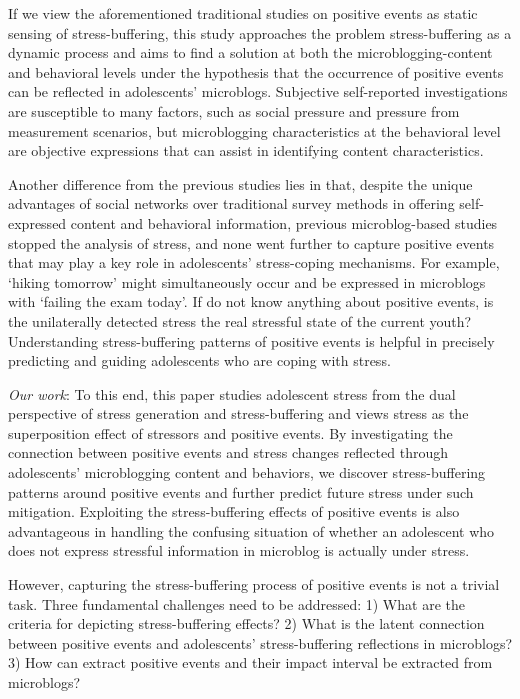 \documentclass[5p,times,numbers,authoryear]{elsarticle}
\begin{document}
If we view the aforementioned traditional studies on positive events as static sensing of stress-buffering, this study approaches the problem stress-buffering as a dynamic process
and aims to find a solution at both the microblogging-content and behavioral levels under the hypothesis that the occurrence of positive events can be reflected in adolescents' microblogs.
Subjective self-reported investigations are susceptible to many factors,
such as
{social pressure}
and pressure from measurement scenarios, but
microblogging characteristics at the behavioral level are objective expressions that can assist in identifying content characteristics.

Another difference from the previous studies lies in that, despite the unique advantages of social networks over traditional survey methods in offering self-expressed content and behavioral information, previous microblog-based studies stopped the analysis of stress,
and none went further to capture positive events that may play a key role in adolescents' stress-coping mechanisms.
For example, `hiking tomorrow' might simultaneously occur and be expressed in microblogs with
{`failing the exam today'.}
If do not know anything about positive events, is the unilaterally detected stress the real stressful state of the current youth?
Understanding stress-buffering patterns of positive events is helpful in precisely predicting and guiding adolescents who are coping with stress.

\emph{Our work}:
To this end, this paper studies adolescent stress from the dual perspective of stress generation and stress-buffering and views stress as the superposition effect of stressors and positive events.
By investigating the connection between positive events and stress changes
reflected through adolescents' microblogging content and behaviors, we discover stress-buffering patterns around positive events and further predict future stress under such mitigation.
Exploiting the stress-buffering effects of positive events is also advantageous in handling the confusing situation of whether an adolescent who does not express stressful information in microblog is actually under stress.

However, capturing the stress-buffering process of positive events is not a trivial task.
Three fundamental challenges need to be addressed:
1) What are the criteria for depicting
{stress-buffering effects?}
2) What is the latent connection between positive events and adolescents' stress-buffering reflections in microblogs?
3) How  can extract positive events and their impact interval be extracted from microblogs?
\end{document}
